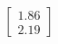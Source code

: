 \documentclass[preview]{standalone}
\begin{document}
\begin{align*}
\begin{bmatrix} 1.86 \\ 2.19 \end{bmatrix}
\end{align*}
\end{document}
